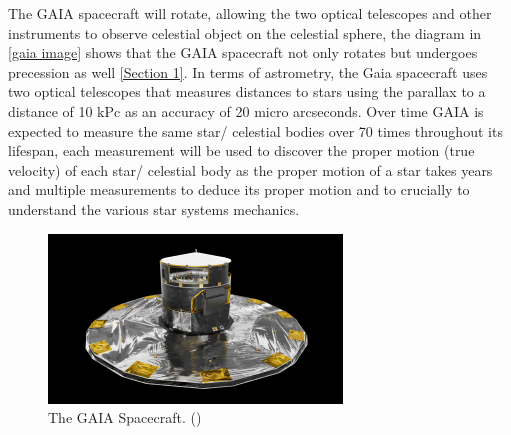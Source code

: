 \documentclass[12pt]{article}
\begin{document}
The GAIA spacecraft will rotate, allowing the two optical telescopes and other instruments to observe celestial object on the celestial sphere, the diagram in \cref{gaia image} shows that the GAIA spacecraft not only rotates but undergoes precession as well \cref{Section 1}. In terms of astrometry, the Gaia spacecraft uses two optical telescopes that measures distances to stars using the parallax to a distance of 10 kPc as an accuracy of 20 micro arcseconds. Over time GAIA is expected to measure the same star/ celestial bodies over 70 times throughout its lifespan, each measurement will be used to discover the proper motion (true velocity) of each star/ celestial body as the proper motion of a star takes years and multiple measurements to deduce its proper motion and to crucially to understand the various star systems mechanics. 

\begin{figure}[H]
\centering
\includegraphics[scale=0.8]{Images/S3/Spacecraft.jpg}
\caption{The GAIA Spacecraft. (\cite{over})}
\label{spacecraft}
\end{figure}

\newpage
{}


\end{document}
